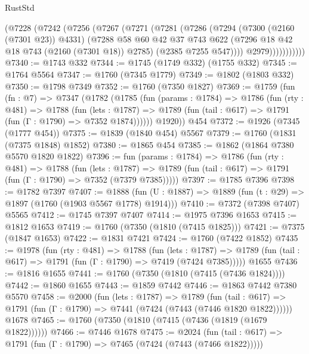 \begin{lexlean}{RustStd}
\begin{coremodule}
              (@7228
                (@7242
                  (@7256
                    (@7267
                      (@7271
                        (@7281
                          (@7286
                            (@7294
                              (@7300 (@2160 (@7301 @23)) @4331)
                              (@7288
                                @58
                                @60
                                @42
                                @37
                                @743
                                @622
                                (@7296 @18 @42 @18 @743 (@2160 (@7301 @18)) @2785)
                                (@2385 @7255 @547))))
                          @2979)))))))))))
@7340 := @1743 @332
@7344 := @1745 (@1749 @332) (@1755 @332)
@7345 := @1764 @5564
@7347 := @1760 (@7345 @1779)
@7349 := @1802 (@1803 @332)
@7350 := @1798 @7349
@7352 := @1760 (@7350 @1827)
@7369 := @1759
    (fun (fn : @7) =>
    @7347
      (@1782
        (@1785
          (fun (params : @1784) =>
          @1786
            (fun (rty : @481) =>
            @1788
              (fun (lets : @1787) =>
              @1789 (fun (tail : @617) => @1791 (fun (Γ : @1790) => @7352 @1874))))))
        @1920))
    @454
@7372 := @1926 (@7345 (@1777 @454))
@7375 := @1839 (@1840 @454) @5567
@7379 := @1760 (@1831 (@7375 @1848) @1852)
@7380 := @1865 @454
@7385 := @1862 (@1864 @7380 @5570 @1820 @1822)
@7396 := fun (params : @1784) =>
  @1786
    (fun (rty : @481) =>
    @1788
      (fun (lets : @1787) =>
      @1789 (fun (tail : @617) => @1791 (fun (Γ : @1790) => @7352 (@7379 @7385)))))
@7397 := @1785 @7396
@7398 := @1782 @7397
@7407 := @1888 (fun (U : @1887) => @1889 (fun (t : @29) => @1897 (@1760 (@1903 @5567 @1778) @1914)))
@7410 := @7372 (@7398 @7407) @5565
@7412 := @1745 @7397 @7407
@7414 := @1975 @7396 @1653
@7415 := @1812 @1653
@7419 := @1760 (@7350 (@1810 (@7415 @1825)))
@7421 := @7375 (@1847 @1653)
@7422 := @1831 @7421
@7424 := @1760 (@7422 @1852)
@7435 := @1978
    (fun (rty : @481) =>
    @1788
      (fun (lets : @1787) =>
      @1789 (fun (tail : @617) => @1791 (fun (Γ : @1790) => @7419 (@7424 @7385)))))
    @1655
@7436 := @1816 @1655
@7441 := @1760 (@7350 (@1810 (@7415 (@7436 @1824))))
@7442 := @1860 @1655
@7443 := @1859 @7442
@7446 := @1863 @7442 @7380 @5570
@7458 := @2000
    (fun (lets : @1787) =>
    @1789
      (fun (tail : @617) => @1791 (fun (Γ : @1790) => @7441 (@7424 (@7443 (@7446 @1820 @1822))))))
    @1678
@7465 := @1760 (@7350 (@1810 (@7415 (@7436 (@1819 (@1679 @1822))))))
@7466 := @7446 @1678
@7475 := @2024
    (fun (tail : @617) => @1791 (fun (Γ : @1790) => @7465 (@7424 (@7443 (@7466 @1822)))))

\end{coremodule}
\end{lexlean}
